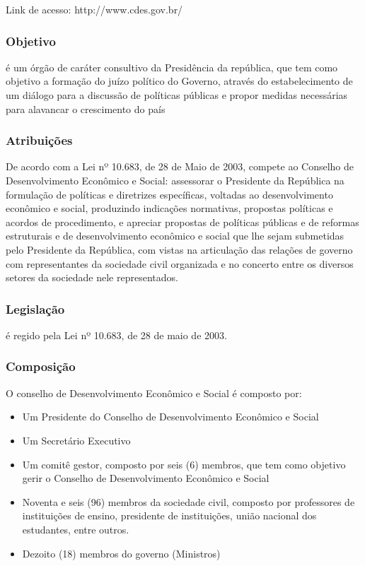 Link de acesso: http://www.cdes.gov.br/

\subsubsection*{Objetivo}

é um órgão de caráter consultivo da Presidência da
república, que tem como objetivo a formação do juízo
político do Governo, através do estabelecimento de um diálogo
para a discussão de políticas públicas e propor medidas
necessárias para alavancar o crescimento do país

\subsubsection*{Atribuições}

De acordo com a Lei nº 10.683, de 28 de Maio de 2003,
compete ao Conselho de Desenvolvimento Econômico e Social:
assessorar o Presidente da República na
formulação de políticas e diretrizes específicas, voltadas ao
desenvolvimento econômico e social, produzindo indicações
normativas, propostas políticas e acordos de procedimento, e apreciar
propostas de políticas públicas e de reformas estruturais e de
desenvolvimento econômico e social que lhe sejam submetidas pelo
Presidente da República, com vistas na articulação das
relações de governo com representantes da sociedade civil
organizada e no concerto entre os diversos setores da sociedade nele
representados.

\subsubsection*{Legislação}

é regido pela Lei nº 10.683, de 28 de maio de 2003.

\subsubsection*{Composição}

O conselho de Desenvolvimento Econômico e Social é composto por:

\begin{itemize}
\item 
Um Presidente do Conselho de Desenvolvimento Econômico e Social
\item 
Um Secretário Executivo
\item 
Um comitê gestor, composto por seis (6) membros, que tem como objetivo
gerir o Conselho de Desenvolvimento Econômico e Social
\item 
Noventa e seis (96) membros da sociedade civil, composto por professores
de instituições de ensino, presidente de instituições,
união nacional dos estudantes, entre outros.
\item 
Dezoito (18) membros do governo (Ministros)
\end{itemize}
\newpage
